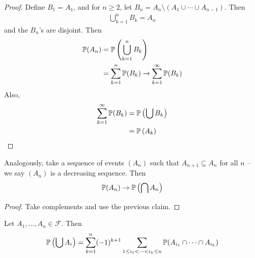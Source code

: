 \documentclass{../template/note}
\begin{document}
    \begin{proof}
        Define \(B_1 = A_1\), and for \(n \geq 2\), let \(B_n = A_n \setminus (A_1 \cup \cdots \cup A_{n-1})\). Then
        \begin{align*}
            \bigcup_{k=1}^n B_k = A_n
        \end{align*}
        and the \(B_n\)'s are disjoint. Then
        \begin{align*}
            \mathbb P(A_n) &= \mathbb P\left(\bigcup_{k=1}^n B_k\right) \\
            &= \sum_{k=1}^n \mathbb P(B_k) \to \sum_{k=1}^\infty \mathbb P(B_k)
        \end{align*}
        Also,
        \begin{align*}
            \sum_{k=1}^\infty \mathbb P(B_k) &= \mathbb P\left(\bigcup B_k\right) \\
            &= \mathbb P\left(A_k\right)
        \end{align*}
    \end{proof}
    
    \begin{corollary}
        Analogously, take a sequence of events \((A_n)\) such that \(A_{n+1} \subseteq A_n\) for all \(n\) -- we say \((A_n)\) is a decreasing sequence. Then
        \begin{align*}
            \mathbb P(A_n) \to \mathbb P\left(\bigcap A_n\right)
        \end{align*}
    \end{corollary}
    
    \begin{proof}
        Take complements and use the previous claim.
    \end{proof}
    
    \begin{proposition}
        Let \(A_1, \dots, A_n \in \mathcal F\). Then
        \begin{align*}
            \mathbb P\left(\bigcup A_i\right) = \sum_{k=1}^n (-1)^{k+1} \sum_{1 \leq i_1 < \dots < i_k \leq n} \mathbb P(A_{i_1} \cap \cdots \cap A_{i_k})
        \end{align*}
    \end{proposition}
    
\end{document}
